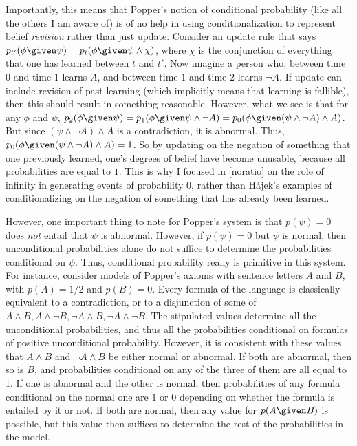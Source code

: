 Importantly, this means that Popper's notion of conditional probability (like all the others I am aware of) is of no help in using conditionalization to represent belief \emph{revision} rather than just update. Consider an update rule that says $p_{t'}(\phi \given \psi)=p_{t}(\phi \given \psi\land\chi)$, where $\chi$ is the conjunction of everything that one has learned between $t$ and $t'$. Now imagine a person who, between time $0$ and time $1$ learns $A$, and between time $1$ and time $2$ learns $\lnot A$. If update can include revision of past learning (which implicitly means that learning is fallible), then this should result in something reasonable. However, what we see is that for any $\phi$ and $\psi$, $p_2(\phi \given \psi)=p_1(\phi \given \psi\land\lnot A)=p_0(\phi \given (\psi\land\lnot A)\land A)$. But since $(\psi\land\lnot A)\land A$ is a contradiction, it is abnormal. Thus, $p_0(\phi \given (\psi\land\lnot A)\land A)=1$. So by updating on the negation of something that one previously learned, one's degrees of belief have become unusable, because all probabilities are equal to $1$. This is why I focused in \autoref{noratio} on the role of infinity in generating events of  probability $0$, rather than H\'{a}jek's examples of conditionalizing on the negation of something that has already been learned.

However, one important thing to note for Popper's system is that ${p(\psi)=0}$ does \emph{not} entail that $\psi$ is abnormal. However, if $p(\psi)=0$ but $\psi$ is normal, then unconditional probabilities alone do not suffice to determine the probabilities conditional on $\psi$. Thus, conditional probability really is primitive in this system. For instance, consider models of Popper's axioms with sentence letters $A$ and $B$, with $p(A)=1/2$ and $p(B)=0$. Every formula of the language is classically equivalent to a contradiction, or to a disjunction of some of $A\land B, A\land\lnot B, \lnot A\land B, \lnot A\land\lnot B$. The stipulated values determine all the unconditional probabilities, and thus all the probabilities conditional on formulas of positive unconditional probability. However, it is consistent with these values that $A\land B$ and $\lnot A\land B$ be either normal or abnormal. If both are abnormal, then so is $B$, and probabilities conditional on any of the three of them are all equal to $1$. If one is abnormal and the other is normal, then probabilities of any formula conditional on the normal one are $1$ or $0$ depending on whether the formula is entailed by it or not. If both are normal, then any value for $p(A \given B)$ is possible, but this value then suffices to determine the rest of the probabilities in the model.

